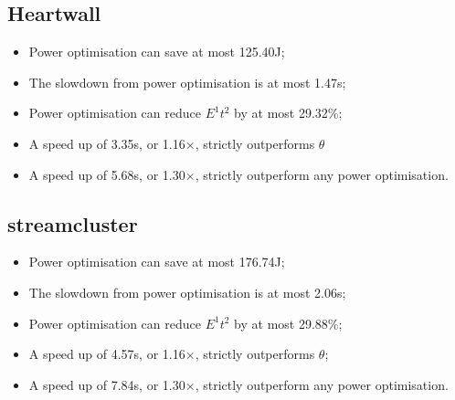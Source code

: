 \subsection{Heartwall}
\begin{itemize}
  \item Power optimisation can save at most 125.40J;
  \item The slowdown from power optimisation is at most 1.47s;
  \item Power optimisation can reduce $E^1t^2$ by at most 29.32\%;
  \item A speed up of 3.35s, or 1.16$\times$, strictly outperforms $\theta$
  \item A speed up of 5.68s, or 1.30$\times$, strictly outperform any power optimisation.
\end{itemize}

\subsection{streamcluster}
\begin{itemize}
  \item Power optimisation can save at most 176.74J;
  \item The slowdown from power optimisation is at most 2.06s;
  \item Power optimisation can reduce $E^1t^2$ by at most 29.88\%;
  \item A speed up of 4.57s, or 1.16$\times$, strictly outperforms $\theta$;
  \item A speed up of 7.84s, or 1.30$\times$, strictly outperform any power optimisation.
\end{itemize}
